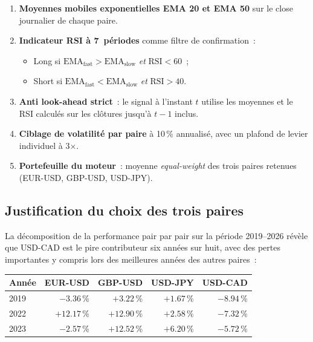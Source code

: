 \begin{enumerate}
\item \textbf{Moyennes mobiles exponentielles EMA 20 et EMA 50} sur le close journalier de chaque paire.
\item \textbf{Indicateur RSI à 7~périodes} comme filtre de confirmation~:
  \begin{itemize}
  \item Long si $\mathrm{EMA}_{\mathrm{fast}} > \mathrm{EMA}_{\mathrm{slow}}$ \emph{et} $\mathrm{RSI} < 60$~;
  \item Short si $\mathrm{EMA}_{\mathrm{fast}} < \mathrm{EMA}_{\mathrm{slow}}$ \emph{et} $\mathrm{RSI} > 40$.
  \end{itemize}
\item \textbf{Anti look-ahead strict}~: le signal à l'instant $t$ utilise les moyennes et le RSI calculés sur les clôtures jusqu'à $t-1$ inclus.
\item \textbf{Ciblage de volatilité par paire} à 10\,\% annualisé, avec un plafond de levier individuel à 3$\times$.
\item \textbf{Portefeuille du moteur}~: moyenne \emph{equal-weight} des trois paires retenues (EUR-USD, GBP-USD, USD-JPY).
\end{enumerate}

\subsection{Justification du choix des trois paires}

La décomposition de la performance pair par pair sur la période 2019--2026 révèle que USD-CAD est le pire contributeur six années sur huit, avec des pertes importantes y compris lors des meilleures années des autres paires~:

\begin{center}
\renewcommand{\arraystretch}{1.1}
\begin{tabular}{lrrrr}
\toprule
\textbf{Année} & \textbf{EUR-USD} & \textbf{GBP-USD} & \textbf{USD-JPY} & \textbf{USD-CAD} \\
\midrule
2019 & $-3.36$\,\% & $+3.22$\,\% & $+1.67$\,\% & \textcolor{combinedBurgundy}{$-8.94$\,\%} \\
2022 & $+12.17$\,\% & $+12.90$\,\% & $+2.58$\,\% & \textcolor{combinedBurgundy}{$-7.32$\,\%} \\
2023 & $-2.57$\,\% & $+12.52$\,\% & $+6.20$\,\% & \textcolor{combinedBurgundy}{$-5.72$\,\%} \\
\bottomrule
\end{tabular}
\end{center}

